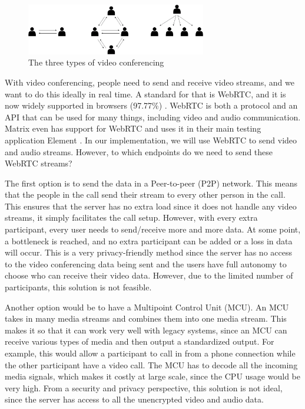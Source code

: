 \documentclass{report}
\begin{document}
    \begin{figure}[!hbt]
        \centering
        \includegraphics[width=0.7\textwidth]{img/three-types}
        \caption{The three types of video conferencing}
        \label{fig:enter-label}
    \end{figure}

    With video conferencing, people need to send and receive video streams, and we want to do this ideally in real time.
    A standard for that is WebRTC, and it is now widely supported in browsers (97.77\%) \cite{CIUIWEBRTC}
    . WebRTC is both a protocol and an API that can be used for many things, including video and audio communication.
    Matrix even has support for WebRTC and uses it in their main testing application Element \cite{ELEMENT}
    . In our implementation, we will use WebRTC to send video and audio streams. However, to which endpoints do we need
    to send these WebRTC streams?

    The first option is to send the data in a Peer-to-peer (P2P) network. This means that the people in the call send
    their stream to every other person in the call. This ensures that the server has no extra load since it does not
    handle any video streams, it simply facilitates the call setup. However, with every extra participant, every user
    needs to send/receive more and more data. At some point, a bottleneck is reached, and no extra participant can be
    added or a loss in data will occur. This is a very privacy-friendly method since the server has no access to the
    video conferencing data being sent and the users have full autonomy to choose who can receive their video data.
    However, due to the limited number of participants, this solution is not feasible.

    Another option would be to have a Multipoint Control Unit (MCU). An MCU takes in many media streams and combines
    them into one media stream. This makes it so that it can work very well with legacy systems, since an MCU can
    receive various types of media and then output a standardized output. For example, this would allow a participant to
    call in from a phone connection while the other participant have a video call. The MCU has to decode all the
    incoming media signals, which makes it costly at large scale, since the CPU usage would be very high. From a
    security and privacy perspective, this solution is not ideal, since the server has access to all the unencrypted
    video and audio data.
\end{document}
